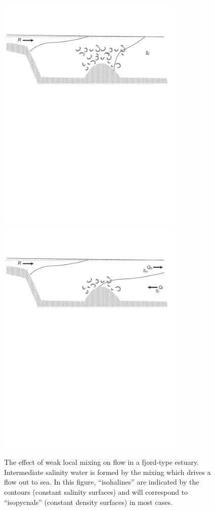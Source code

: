 \begin{figure}[htb]
  \centering
  \includegraphics[width=3.5in]{figs/EstuaryLocal}
  \includegraphics[width=3.5in]{figs/EstuaryLow}
  \caption{The effect of weak local mixing on flow in a fjord-type
    estuary. Intermediate salinity water is formed by the mixing which
  drives a flow out to sea.  In this figure, ``isohalines'' are indicated by the contours (constant salinity surfaces) and will correspond to ``isopycnals'' (constant density surfaces) in most cases.  }
  \label{fig:EstuaryLocal}
\end{figure}

